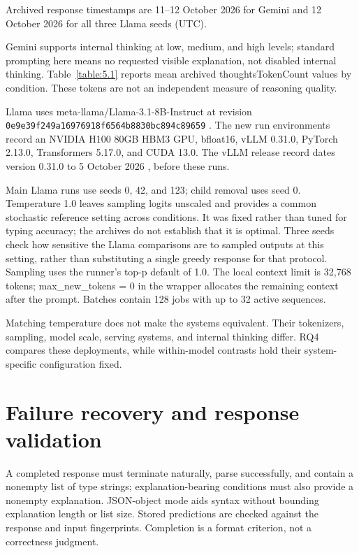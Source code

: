 {\small Archived response timestamps are 11–12 October 2026 for Gemini and 12 October 2026 for all three Llama seeds (UTC).\par}


Gemini supports internal thinking at low, medium, and high levels; standard prompting here means no requested visible explanation, not disabled internal thinking. Table~\ref{table:5.1} reports mean archived thoughtsTokenCount values by condition. These tokens are not an independent measure of reasoning quality.


Llama uses meta-llama/Llama-3.1-8B-Instruct at revision \nolinkurl{0e9e39f249a16976918f6564b8830bc894c89659} \citep{grattafiori2024}. The new run environments record an NVIDIA H100 80GB HBM3 GPU, bfloat16, vLLM 0.31.0, PyTorch 2.13.0, Transformers 5.17.0, and CUDA 13.0. The vLLM release record dates version 0.31.0 to 5 October 2026 \citep{vllmproject2026}, before these runs.


Main Llama runs use seeds 0, 42, and 123; child removal uses seed 0. Temperature 1.0 leaves sampling logits unscaled and provides a common stochastic reference setting across conditions. It was fixed rather than tuned for typing accuracy; the archives do not establish that it is optimal. Three seeds check how sensitive the Llama comparisons are to sampled outputs at this setting, rather than substituting a single greedy response for that protocol. Sampling uses the runner’s top-p default of 1.0. The local context limit is 32,768 tokens; max\_\allowbreak{}new\_\allowbreak{}tokens = 0 in the wrapper allocates the remaining context after the prompt. Batches contain 128 jobs with up to 32 active sequences.


Matching temperature does not make the systems equivalent. Their tokenizers, sampling, model scale, serving systems, and internal thinking differ. RQ4 compares these deployments, while within-model contrasts hold their system-specific configuration fixed.


\FloatBarrier

\section{Failure recovery and response validation}

A completed response must terminate naturally, parse successfully, and contain a nonempty list of type strings; explanation-bearing conditions must also provide a nonempty explanation. JSON-object mode aids syntax without bounding explanation length or list size. Stored predictions are checked against the response and input fingerprints. Completion is a format criterion, not a correctness judgment.


